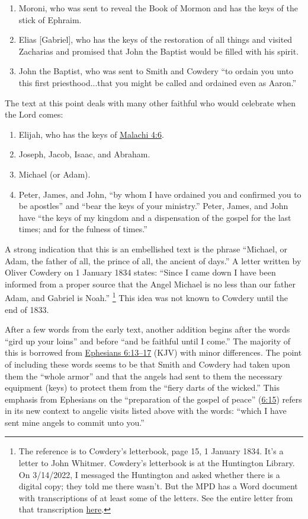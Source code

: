 		\begin{enumerate}
			\item Moroni, who was sent to reveal the Book of Mormon and has the keys of the stick of Ephraim.
			\item Elias [Gabriel], who has the keys of the restoration of all things and visited Zacharias and promised that John the Baptist would be filled with his spirit.
			\item John the Baptist, who was sent to Smith and Cowdery ``to ordain you unto this first priesthood...that you might be called and ordained even as Aaron.''
		\end{enumerate}

		The text at this point deals with many other faithful who would celebrate when the Lord comes:
		
		\begin{enumerate}\addtocounter{enumi}{3}
			\item Elijah, who has the keys of \hyperref[MALACHI-4-6]{Malachi 4:6}.
			\item Joseph, Jacob, Isaac, and Abraham.
			\item Michael (or Adam).
			\item Peter, James, and John, ``by whom I have ordained you and confirmed you to be apostles'' and ``bear the keys of your ministry.'' Peter, James, and John have ``the keys of my kingdom and a dispensation of the gospel for the last times; and for the fulness of times.''
		\end{enumerate}

		A strong indication that this is an embellished text is the phrase ``Michael, or Adam, the father of all, the prince of all, the ancient of days.'' A letter written by Oliver Cowdery on 1 January 1834 states: ``Since I came down I have been informed from a proper source that the Angel Michael is no less than our father Adam, and Gabriel is Noah.''%
		\footnote{%
			The reference is to Cowdery's letterbook, page 15, 1 January 1834. It's a letter to John Whitmer. Cowdery's letterbook is at the Huntington Library. On 3/14/2022, I messaged the Huntington and asked whether there is a digital copy; they told me there wasn't. But the MPD has a Word document with transcriptions of at least some of the letters. See the entire letter from that transcription \hyperref[EMS-1834-OC-1-JAN-1834]{here}.
			} 
		This idea was not known to Cowdery until the end of 1833.

		After a few words from the early text, another addition begins after the words ``gird up your loins'' and before ``and be faithful until I come.'' The majority of this is borrowed from \hyperref[EPHESIANS-6-13]{Ephesians 6:13--17} (KJV) with minor differences. The point of including these words seems to be that Smith and Cowdery had taken upon them the ``whole armor'' and that the angels had sent to them the necessary equipment (keys) to protect them from the ``fiery darts of the wicked.'' This emphasis from Ephesians on the ``preparation of the gospel of peace'' (\hyperref[EPHESIANS-6-15]{6:15}) refers in its new context to angelic visits listed above with the words: ``which I have sent mine angels to commit unto you.''

